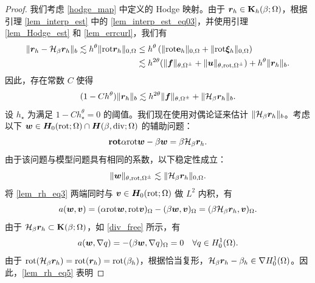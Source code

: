 \begin{proof}
我们考虑 \eqref{hodge_map} 中定义的 Hodge 映射。由于 $\boldsymbol{r}_h\in \mathbf{K}_h(\beta;\Omega)$，根据引理 \ref{lem_interp_est} 中的 \eqref{lem_interp_est_eq03}，并使用引理 \ref{lem_Hodge_est} 和 \ref{lem_errcurl}，我们有
\begin{equation}
\begin{aligned}
\label{lem_rh_eq1}
\| \boldsymbol{r}_h - \mathcal{H}_{\beta} \boldsymbol{r}_h \|_{b} \lesssim h^{\theta} \| \mathrm{rot} \boldsymbol{r}_h \|_{0,\Omega}
& \leq  h^{\theta} \left( \| \mathrm{rot} \mathbf{e}_h \|_{0,\Omega} + \| \mathrm{rot} \boldsymbol{\xi}_h \|_{0,\Omega}  \right) \\
& \lesssim  h^{2\theta}  (\| \boldsymbol{f} \|_{\theta,\Omega^{\pm}} + \| \boldsymbol{u} \|_{\theta,\mathrm{rot},\Omega^{\pm}})
+   h^{\theta}  \| \boldsymbol{r}_h \|_b  .
\end{aligned}
\end{equation}
因此，存在常数 $C$ 使得
\begin{equation}
\label{lem_rh_eq2}
(1 - C h^{\theta})\| \boldsymbol{r}_h \|_b \lesssim h^{2\theta}  \| \boldsymbol{f} \|_{\theta,\Omega^{\pm}}   + \| \mathcal{H}_{\beta} \boldsymbol{r}_h \|_{b}.
\end{equation}
设 $h_{\star}$ 为满足 $1 - C h_{\star}^{\theta} = 0$ 的阈值。我们现在使用对偶论证来估计 $\| \mathcal{H}_{\beta} \boldsymbol{r}_h \|_{b}$。考虑以下 $\boldsymbol{w} \in \boldsymbol{H}_0(\mathrm{rot};\Omega)\cap\boldsymbol{H}(\beta,\mathrm{div};\Omega)$ 的辅助问题：
\begin{equation}
\label{lem_rh_eq3}
\mathbf{rot} \alpha \mathrm{rot} \boldsymbol{w} - \beta \boldsymbol{w} = \beta \mathcal{H}_{\beta} \boldsymbol{r}_h.
\end{equation}
由于该问题与模型问题具有相同的系数，以下稳定性成立：
\begin{equation}
\label{lem_rh_eq3_1}
\| \boldsymbol{w} \|_{\theta,\mathrm{rot},\Omega^{\pm}} \lesssim \| \mathcal{H}_{\beta} \boldsymbol{r}_h \|_{0,\Omega}.
\end{equation}
将 \eqref{lem_rh_eq3} 两端同时与 $\boldsymbol{v}\in\boldsymbol{H}_0(\mathrm{rot};\Omega)$ 做 $L^2$ 内积，有
\begin{equation}
\label{lem_rh_eq4}
a(\boldsymbol{w},\boldsymbol{v}) = (\alpha\mathrm{rot} \boldsymbol{w}, \mathrm{rot} \boldsymbol{v})_{\Omega} - (\beta \boldsymbol{w}, \boldsymbol{v})_{\Omega} = (\beta \mathcal{H}_{\beta} \boldsymbol{r}_h,\boldsymbol{v})_{\Omega}.
\end{equation}
由于 $\mathcal{H}_{\beta} \boldsymbol{r}_h\subset\mathbf{K}(\beta;\Omega)$，如 \eqref{div_free} 所示，有
\begin{equation}
\label{lem_rh_eq5}
a(\boldsymbol{w},\nabla q) = -(\beta \boldsymbol{w}, \nabla q)_{\Omega} = 0 ~~~ \forall q \in H^1_0(\Omega).
\end{equation}
由于 $\mathrm{rot}(\mathcal{H}_{\beta} \boldsymbol{r}_h) = \mathrm{rot}(\boldsymbol{r}_h) =
\mathrm{rot}(\beta_h)$，根据恰当复形，$\mathcal{H}_{\beta} \boldsymbol{r}_h -\beta_h \in \nabla H^1_0(\Omega)$。因此，\eqref{lem_rh_eq5} 表明

\end{proof}
